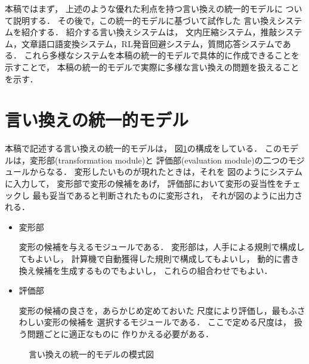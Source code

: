 本稿ではまず，
上述のような優れた利点を持つ言い換えの統一的モデルに
ついて説明する．
その後で，この統一的モデルに基づいて試作した
言い換えシステムを紹介する．
紹介する言い換えシステムは，
文内圧縮システム，推敲システム，文章語口語変換システム，RL発音回避システム，質問応答システムである．
これら多様なシステムを本稿の統一的モデルで具体的に作成できることを示すことで，
本稿の統一的モデルで実際に多様な言い換えの問題を扱えることを示す．

\section{言い換えの統一的モデル}
\label{sec:model}

本稿で記述する言い換えの統一的モデルは，
図\ref{fig:model}の構成をしている．
このモデルは，変形部(transformation module)と
評価部(evaluation module)の二つのモジュールからなる．
変形したいものが現れたときは，それを
図のようにシステムに入力して，
変形部で変形の候補をあげ，
評価部において変形の妥当性をチェックし
最も妥当であると判断されたものに変形され，
それが図のように出力される．
{
\begin{itemize}
\item 
  変形部

  変形の候補を与えるモジュールである．
  変形部は，人手による規則で構成してもよいし，
  計算機で自動獲得した規則で構成してもよいし，
  動的に書き換え候補を生成するものでもよいし，
  これらの組合わせでもよい．

\item 
  評価部

  変形の候補の良さを，あらかじめ定めておいた
  尺度により評価し，最もふさわしい変形の候補を
  選択するモジュールである．
  ここで定める尺度は，
  扱う問題ごとに適正なものに
  作りかえる必要がある．

\end{itemize}}

\begin{figure}[t]
      \begin{center}
      \end{center}
      \caption{言い換えの統一的モデルの模式図}
      \label{fig:model}
\end{figure}

